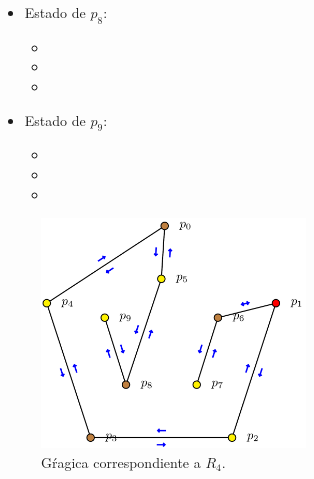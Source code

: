 \begin{multicols}{2}
\begin{itemize}
\begin{itemize}
      \item {}
      \end{itemize}

\item Estado de $p_8$:
      \begin{itemize}
      \item {}
      
      \item {}
      
      \item {}
      \end{itemize}

\item Estado de $p_9$:
      \begin{itemize}
      \item {}
      
      \item {}
      
      \item {}
      \end{itemize}

\end{itemize}
\end{multicols} 

\begin{figure}[ht]
        \begin{center}
                \includegraphics[width=7cm]{R4.png}
                \caption{Gŕagica correspondiente a $R_4$.}
        \end{center}
\end{figure}

